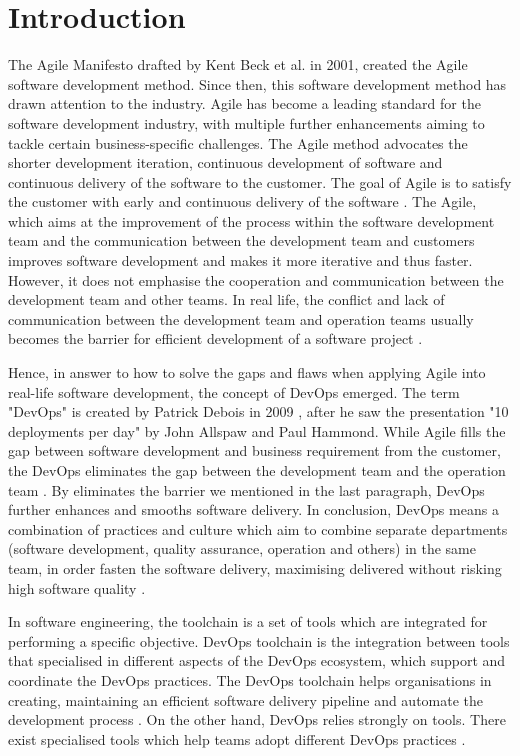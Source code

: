 \chapter{Introduction}
\label{chp:introduction}
The Agile Manifesto \cite{beck2001manifesto} drafted by Kent Beck et al. in 2001, created the Agile software development method. Since then, this software development method has drawn attention to the industry. Agile has become a leading standard for the software development industry, with multiple further enhancements aiming to tackle certain business-specific challenges.
The Agile method advocates the shorter development iteration, continuous development of software and continuous delivery of the software to the customer. The goal of Agile is to satisfy the customer with early and continuous delivery of the software \cite{beck2001manifesto}.
The Agile, which aims at the improvement of the process within the software development team and the communication between the development team and customers \cite{miglierina2014application} improves software development and makes it more iterative and thus faster. However, it does not emphasise the cooperation and communication between the development team and other teams. In real life, the conflict and lack of communication between the development team and operation teams usually becomes the barrier for efficient development of a software project \cite{jabbari2016devops}.
\par
Hence, in answer to how to solve the gaps and flaws when applying Agile into real-life software development, the concept of DevOps emerged. The term "DevOps" is created by Patrick Debois in 2009 \cite{kim2016devops}, after he saw the presentation "10 deployments per day" by John Allspaw and Paul Hammond. While Agile fills the gap between software development and business requirement from the customer, the DevOps eliminates the gap between the development team and the operation team \cite{WhatisaD20:online}. By eliminates the barrier we mentioned in the last paragraph, DevOps further enhances and smooths software delivery. In conclusion, DevOps means a combination of practices and culture which aim to combine separate departments (software development, quality assurance, operation and others) in the same team, in order fasten the software delivery, maximising delivered without risking high software quality \cite{DevOpsWi87:online}\cite{ebert2016devops}.
\par
In software engineering, the toolchain is a set of tools which are integrated for performing a specific objective. DevOps toolchain is the integration between tools that specialised in different aspects of the DevOps ecosystem, which support and coordinate the DevOps practices. The DevOps toolchain helps organisations in creating, maintaining an efficient software delivery pipeline and automate the development process \cite{DevOpsto7:online}. On the other hand, DevOps relies strongly on tools. There exist specialised tools which help teams adopt different DevOps practices \cite{zhu2016devops}. 
